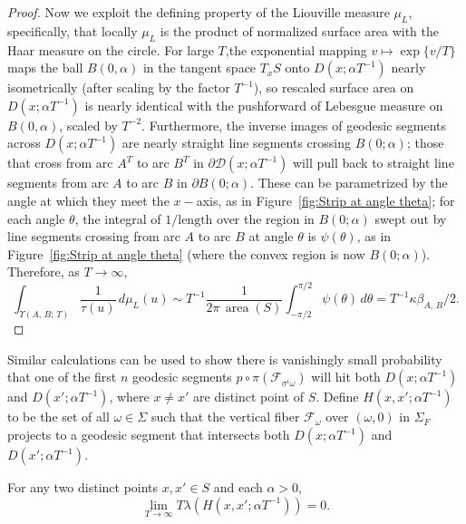 \documentclass[10pt]{amsart}
\theoremstyle{definition}\newtheorem{defi}[theo]{Definition}\newtheorem{rema}[theo]{Remark}\newtheorem{exam}[theo]{Example}\newtheorem{exem}[theo]{Example}\newtheorem{nota}[theo]{Notation}
\DeclareMathOperator{\area}{area}
\begin{document}
\begin{proof}
Now we exploit the defining property of the Liouville measure $\mu_{L}$, specifically, that locally $\mu_{L}$ is the product of normalized surface area with the Haar measure on the circle. For large $T$,the exponential mapping $v\mapsto \exp \{v/T \}$ maps the ball $B(0,\alpha)$ in the tangent space $T_x S$ onto $D (x;\alpha T^{-1})$ nearly isometrically (after scaling by the factor $T^{-1}$), so rescaled surface area on $D (x;\alpha T^{-1})$ is nearly identical with the pushforward of Lebesgue measure on $B (0,\alpha)$, scaled by $T^{-2}$. Furthermore, the inverse images of geodesic segments across $D (x;\alpha T^{-1})$ are nearly straight line segments crossing $B(0;\alpha)$; those that cross from arc $A^{T}$ to arc $B^{T}$ in $\partial \mathcal{D}(x;\alpha T^{-1})$ will pull back to straight line segments from arc $A$ to arc $B$ in $\partial B (0;\alpha)$. These can be parametrized by the angle at which they meet the $x-$axis, as in Figure~\ref{fig:Strip at angle theta}; for each angle $\theta$, the integral of $1/\text{length}$ over the region in $B (0;\alpha)$ swept out by line segments crossing from arc $A$ to arc $B$ at angle $\theta$ is $\psi (\theta)$, as in Figure~\ref{fig:Strip at angle theta} (where the convex region is now $B (0;\alpha)$). Therefore, as $T \rightarrow \infty$,
\[
\int_{\Upsilon (A,\,B;\,T)} \frac{1}{\tau (u)} \,d\mu_{L} (u)\sim T^{-1}\frac{1}{2\pi\, \area (S)} \int_{-\pi /2}^{\pi /2}\psi (\theta) \,d\theta =T^{-1} \kappa \beta_{A,\,B}/2.
\]
\end{proof}



Similar calculations can be used to show there is vanishingly small probability that one of the first $n$ geodesic segments $p\circ\pi (\mathcal{F}_{\sigma^{i}\omega})$ will hit both $D(x;\alpha T^{-1})$ and $D(x';\alpha T^{-1})$, where $x\not =x'$ are distinct point of $S$. Define $H (x,x';\alpha T^{-1})$ to be the set of all $\omega \in \Sigma$ such that the vertical fiber $\mathcal{F}_{\omega}$ over $(\omega,0)$ in $\Sigma_{F}$ projects to a geodesic segment that intersects both $D(x;\alpha T^{-1})$ and $D(x';\alpha T^{-1})$.


\begin{prop}\label{proposition:double-hits}
For any two distinct points $x,x'\in S$ and each $\alpha >0$,
\[
\lim_{T \rightarrow \infty} T\lambda  \left(H \left(x,x';\alpha T^{-1}\right)\right)=0.
\]
\end{prop}
\end{document}
